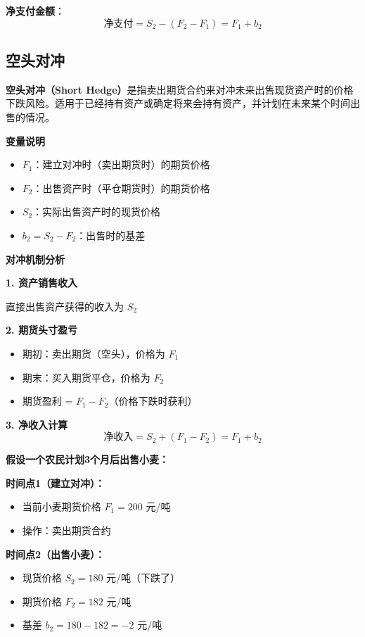 \textbf{净支付金额}：
$$\text{净支付} = S_2 - (F_2 - F_1) = F_1 + b_2$$


\subsection{空头对冲}


\textbf{空头对冲（Short Hedge）}是指卖出期货合约来对冲未来出售现货资产时的价格下跌风险。适用于已经持有资产或确定将来会持有资产，并计划在未来某个时间出售的情况。

\textbf{变量说明}
\begin{itemize}
    \item $F_1$：建立对冲时（卖出期货时）的期货价格
    \item $F_2$：出售资产时（平仓期货时）的期货价格
    \item $S_2$：实际出售资产时的现货价格
    \item $b_2 = S_2 - F_2$：出售时的基差
\end{itemize}


\textbf{对冲机制分析}

\textbf{1. 资产销售收入}

直接出售资产获得的收入为 $S_2$

\textbf{2. 期货头寸盈亏}
\begin{itemize}
    \item 期初：卖出期货（空头），价格为 $F_1$
    \item 期末：买入期货平仓，价格为 $F_2$
    \item 期货盈利 = $F_1 - F_2$（价格下跌时获利）
\end{itemize}

\textbf{3. 净收入计算}
\begin{equation}
\text{净收入} = S_2 + (F_1 - F_2) = F_1 + b_2
\end{equation}

\textbf{假设一个农民计划3个月后出售小麦：}

\textbf{时间点1（建立对冲）：}
\begin{itemize}
    \item 当前小麦期货价格 $F_1 = 200$ 元/吨
    \item 操作：卖出期货合约
\end{itemize}

\textbf{时间点2（出售小麦）：}
\begin{itemize}
    \item 现货价格 $S_2 = 180$ 元/吨（下跌了）
    \item 期货价格 $F_2 = 182$ 元/吨
    \item 基差 $b_2 = 180 - 182 = -2$ 元/吨
\end{itemize}

